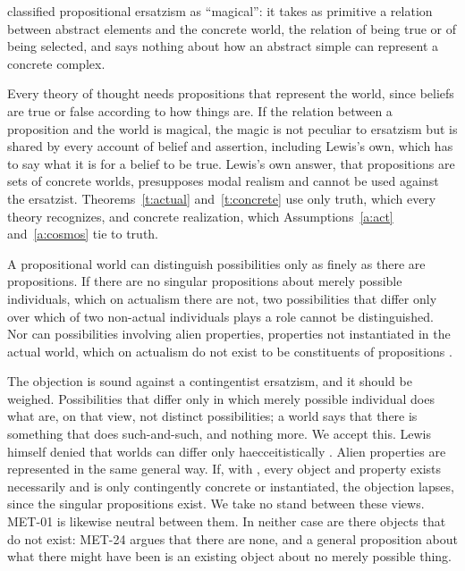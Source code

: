 \documentclass{situationist-preprint}
\begin{document}
\begin{objection}
\citet[\S3.4]{Lewis1986} classified propositional ersatzism as \enquote{magical}: it takes as primitive a relation between abstract elements and the concrete world, the relation of being true or of being selected, and says nothing about how an abstract simple can represent a concrete complex.
\end{objection}

\begin{reply}
Every theory of thought needs propositions that represent the world, since beliefs are true or false according to how things are. If the relation between a proposition and the world is magical, the magic is not peculiar to ersatzism but is shared by every account of belief and assertion, including Lewis's own, which has to say what it is for a belief to be true. Lewis's own answer, that propositions are sets of concrete worlds, presupposes modal realism and cannot be used against the ersatzist. Theorems~\ref{t:actual} and~\ref{t:concrete} use only truth, which every theory recognizes, and concrete realization, which Assumptions~\ref{a:act} and~\ref{a:cosmos} tie to truth.
\end{reply}

\begin{objection}
A propositional world can distinguish possibilities only as finely as there are propositions. If there are no singular propositions about merely possible individuals, which on actualism there are not, two possibilities that differ only over which of two non-actual individuals plays a role cannot be distinguished. Nor can possibilities involving alien properties, properties not instantiated in the actual world, which on actualism do not exist to be constituents of propositions \citep[\S3.2]{Lewis1986}.
\end{objection}

\begin{reply}
The objection is sound against a contingentist ersatzism, and it should be weighed. Possibilities that differ only in which merely possible individual does what are, on that view, not distinct possibilities; a world says that there is something that does such-and-such, and nothing more. We accept this. Lewis himself denied that worlds can differ only haecceitistically \citep[\S4.4]{Lewis1986}. Alien properties are represented in the same general way. If, with \citet{Williamson2013}, every object and property exists necessarily and is only contingently concrete or instantiated, the objection lapses, since the singular propositions exist. We take no stand between these views. MET-01 is likewise neutral between them. In neither case are there objects that do not exist: MET-24 argues that there are none, and a general proposition about what there might have been is an existing object about no merely possible thing.
\end{reply}
\end{document}
